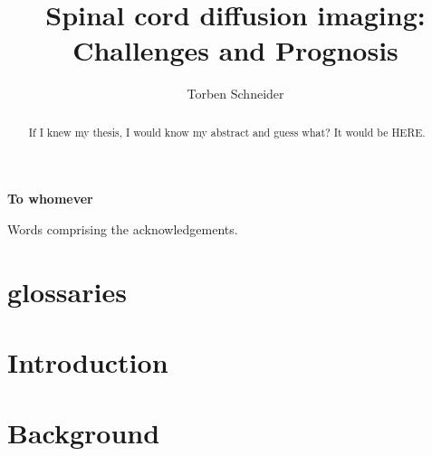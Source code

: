 \documentclass[phd,final]{ucl_thesis}
\title{Spinal cord diffusion imaging: Challenges and Prognosis}
\author{Torben Schneider}
\begin{document}
\maketitle

\clearpage

\begin{center}
\textbf{To whomever}
\end{center}

\begin{abstract}
If I knew my thesis, I would know my abstract and guess what? It
would be HERE.
\end{abstract}

\begin{acknowledgements}
Words comprising the acknowledgements.
\end{acknowledgements}

\setcounter{tocdepth}{2}
\tableofcontents
\listoffigures
\listoftables
\chapter{glossaries}
\printglossaries



\chapter{Introduction}

\chapter{Background}

%
%
%
%
%
%
%





%

\end{document}

